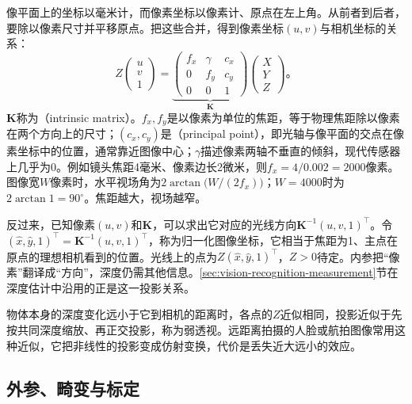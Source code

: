 像平面上的坐标以毫米计，而像素坐标以像素计、原点在左上角。从前者到后者，要除以像素尺寸并平移原点。把这些合并，得到像素坐标$(u,v)$与相机坐标的关系：
\begin{equation}
  Z\begin{pmatrix}u\\v\\1\end{pmatrix}
  =\underbrace{\begin{pmatrix}f_x&\gamma&c_x\\0&f_y&c_y\\0&0&1\end{pmatrix}}_{\bm K}
  \begin{pmatrix}X\\Y\\Z\end{pmatrix}\text{。}
  \label{eq:vision-formation-intrinsics}
\end{equation}
$\bm K$称为（intrinsic matrix）。$f_x,f_y$是以像素为单位的焦距，等于物理焦距除以像素在两个方向上的尺寸；$(c_x,c_y)$是（principal point），即光轴与像平面的交点在像素坐标中的位置，通常靠近图像中心；$\gamma$描述像素两轴不垂直的倾斜，现代传感器上几乎为0。例如镜头焦距4毫米、像素边长2微米，则$f_x=4/0.002=2000$像素。图像宽$W$像素时，水平视场角为$2\arctan\bigl(W/(2f_x)\bigr)$；$W=4000$时为$2\arctan1=90^\circ$。焦距越大，视场越窄。

反过来，已知像素$(u,v)$和$\bm K$，可以求出它对应的光线方向$\bm K^{-1}(u,v,1)^\top$。令$(\hat x,\hat y,1)^\top=\bm K^{-1}(u,v,1)^\top$，称为归一化图像坐标，它相当于焦距为1、主点在原点的理想相机看到的位置。光线上的点为$Z(\hat x,\hat y,1)^\top$，$Z>0$待定。内参把“像素”翻译成“方向”，深度仍需其他信息。\ref{sec:vision-recognition-measurement}节在深度估计中沿用的正是这一投影关系。

物体本身的深度变化远小于它到相机的距离时，各点的$Z$近似相同，投影近似于先按共同深度缩放、再正交投影，称为弱透视。远距离拍摄的人脸或航拍图像常用这种近似，它把非线性的投影变成仿射变换，代价是丢失近大远小的效应。

\subsection{外参、畸变与标定}
\label{sec:vision-formation-calibration}

